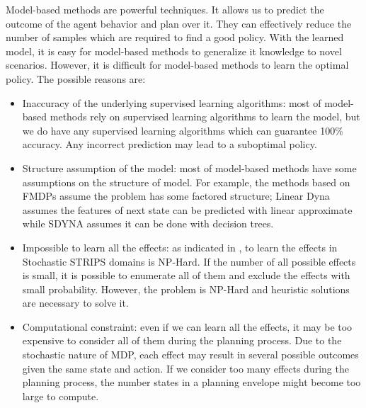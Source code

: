 Model-based methods are powerful techniques. 
It allows us to predict the outcome 
of the agent behavior and plan over it. They can effectively reduce the number of 
samples which are required to find a good policy.
With the learned model, it is easy for model-based methods to generalize
it knowledge to novel scenarios.
However, it is difficult for model-based methods to learn the optimal policy.
The possible reasons are:
\begin{itemize}
\item Inaccuracy of the underlying supervised learning algorithms: most of model-based methods rely on supervised learning algorithms
    to learn the model, but we do have any supervised learning algorithms which can guarantee 100\% accuracy. Any incorrect
    prediction may lead to a suboptimal policy.
\item Structure assumption of the model: most of model-based methods have some assumptions on the structure of model.
    For example, the methods based on FMDPs assume the problem has some factored structure; Linear Dyna \cite{ApproxDyna} assumes
    the features of next state can be predicted with linear approximate while SDYNA assumes it can be done with decision trees.
\item Impossible to learn all the effects: as indicated in \cite{Walsh09}, to learn the effects in Stochastic STRIPS domains is NP-Hard.
    If the number of all possible effects is small, it is possible to enumerate all of them and exclude the effects with
    small probability. However, the problem is NP-Hard and heuristic solutions \cite{Pasula07} are necessary to solve it.
\item Computational constraint: even if we can learn all the effects, it may be too expensive to consider all of them during
    the planning process. Due to the stochastic nature of MDP, each effect may result in several possible outcomes given
    the same state and action. If we consider too many effects during the planning process, the number states in a planning envelope
    might become too large to compute.
\end{itemize}




